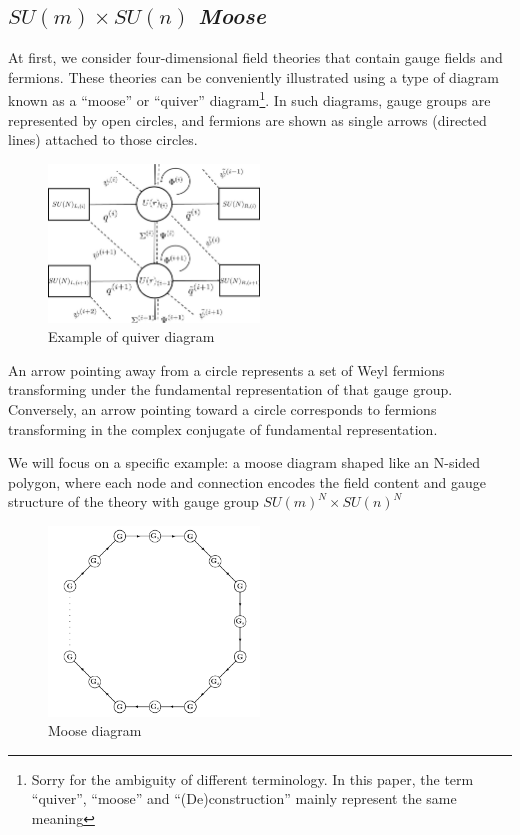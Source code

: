 \documentclass[12pt]{article}
\numberwithin{equation}{section}
\begin{document}
\subsection{$SU(m)\times SU(n)$ \textit{Moose}}
At first, we consider four-dimensional field theories that contain gauge fields and fermions. These theories can be conveniently illustrated using a type of diagram known as a “moose” or “quiver” diagram\footnote{Sorry for the ambiguity of different terminology. In this paper, the term ``quiver'', ``moose'' and ``(De)construction'' mainly represent the same meaning}. In such diagrams, gauge groups are represented by open circles, and fermions are shown as single arrows (directed lines) attached to those circles.
\begin{figure}[H]
    \centering
    \includegraphics[width=0.5\textwidth]{The-quiver-diagram-for-the-2d-N-0-2-theory-corresponds-to-the-surface-defect-S-r.jpg}
    \caption{Example of quiver diagram}
\end{figure}



An arrow pointing away from a circle represents a set of Weyl fermions transforming under the fundamental representation of that gauge group. Conversely, an arrow pointing toward a circle corresponds to fermions transforming in the complex conjugate of fundamental representation.

We will focus on a specific example: a moose diagram shaped like an N-sided polygon, where each node and connection encodes the field content and gauge structure of the theory with gauge group $SU(m)^N\times SU(n)^N$
\begin{figure}[H]
    \centering
    \includegraphics[width=0.5\textwidth]{Moose.png}
    \caption{Moose diagram}
\end{figure}
\end{document}
